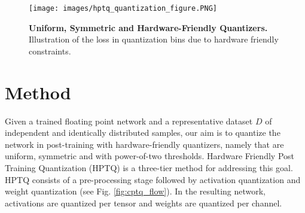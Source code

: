 \documentclass{article}
\begin{document}
\begin{figure}[H]
    \centering
    \texttt{[image: images/hptq\_quantization\_figure.PNG]}
    \caption{\textbf{Uniform, Symmetric and Hardware-Friendly Quantizers.}
    Illustration of the loss in quantization bins due to hardware friendly constraints.}
    \label{fig:quant_com}
\end{figure}
 \section{Method}\label{sec:method}
Given a trained floating point network and a representative dataset $D$ of independent and identically distributed samples, our aim is to quantize the network in post-training with hardware-friendly quantizers, namely that are uniform, symmetric and with power-of-two thresholds. 
Hardware Friendly Post Training Quantization (HPTQ) is a three-tier method for addressing this goal.
HPTQ consists of a pre-processing stage followed by activation quantization and weight quantization (see Fig. \ref{fig:cptq_flow}). 
In the resulting network, activations are quantized per tensor and weights are quantized per channel. 
\end{document}
